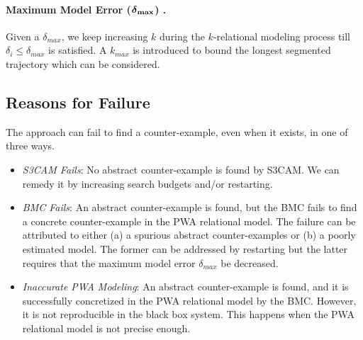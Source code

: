 \paragraph{Maximum Model Error ($\boldsymbol{\delta}_{\bold{max}}$) .}
Given a $\delta_{max}$, we keep increasing $k$ during the
$k$-relational modeling process till $\delta_i \le \delta_{max}$ is
satisfied. A $k_{max}$ is introduced to bound the longest
segmented trajectory which can be considered.


\subsection{Reasons for Failure}
The approach can fail to find a counter-example, even when it exists, in
one of three ways.

\begin{itemize}

    \item \emph{S3CAM Fails}: No abstract counter-example is found by
        S3CAM. We can remedy it by increasing search budgets and/or
        restarting.

    \item \emph{BMC Fails}: An abstract counter-example is found, but
        the BMC fails to find a concrete counter-example in the PWA
        relational model. The failure can be attributed to either (a)
        a spurious abstract counter-examples or (b) a poorly estimated
        model. The former can be addressed by restarting but the
        latter requires that the maximum model error $\delta_{max}$ be
        decreased.

    \item \emph{Inaccurate PWA Modeling}: An abstract counter-example
        is found, and it is successfully concretized in the PWA
        relational model by the BMC. However, it is not reproducible
        in the black box system. This happens when the PWA relational
        model is not precise enough.
\end{itemize}
